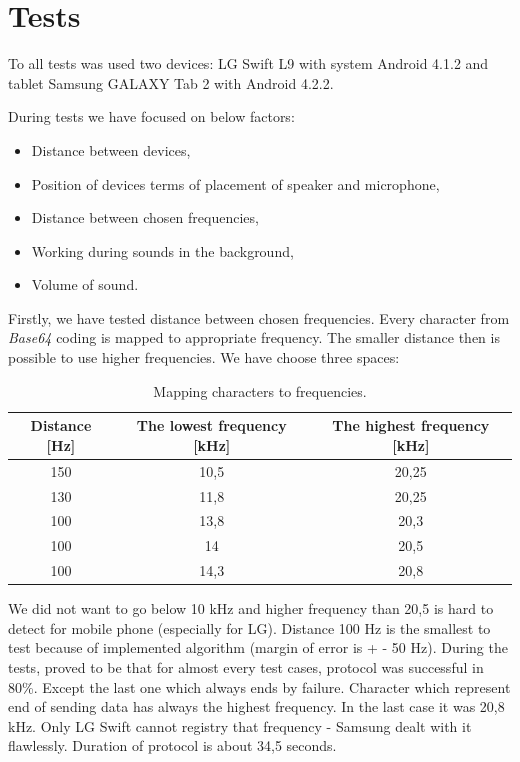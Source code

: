 \documentclass[11pt,titlepage]{article}
\theoremstyle{plain}
\begin{document}
\section{Tests}
To all tests was used two devices: LG Swift L9 with system Android 4.1.2 and tablet Samsung GALAXY Tab 2 with Android 4.2.2. 

During tests we have focused on below factors:
\begin{itemize}
\item Distance between devices,
\item Position of devices terms of placement of speaker and microphone,
\item Distance between chosen frequencies,
\item Working during sounds in the background,
\item Volume of sound.
\end{itemize}

Firstly, we have tested distance between chosen frequencies. Every character from \textit{Base64} coding is mapped to appropriate frequency. The smaller distance then is possible to use higher frequencies. We have choose three spaces:
\begin{table}[H]
	\centering
	\begin{tabular}{| c | c | c |}
		\hline
		Distance [Hz] & The lowest frequency [kHz] & The highest frequency [kHz]\\
		\hline
		150 & 10,5 & 20,25 \\
		\hline
		130 & 11,8 & 20,25 \\
		\hline
		100 & 13,8 & 20,3 \\
		\hline
		100 & 14 & 20,5 \\
		\hline
		100 & 14,3 & 20,8 \\
		\hline
	\end{tabular}
	\caption{Mapping characters to frequencies.}
\end{table}

We did not want to go below 10 kHz and higher frequency than 20,5 is hard to detect for mobile phone (especially for LG). Distance 100 Hz is the smallest to test because of implemented algorithm (margin of error is + - 50 Hz). During the tests, proved to be that for almost every test cases, protocol was successful in 80\%. Except the last one which always ends by failure. Character which represent end of sending data has always the highest frequency. In the last case it was 20,8 kHz. Only LG Swift cannot registry that frequency - Samsung dealt with it flawlessly. Duration of protocol is about 34,5 seconds.
\end{document}
